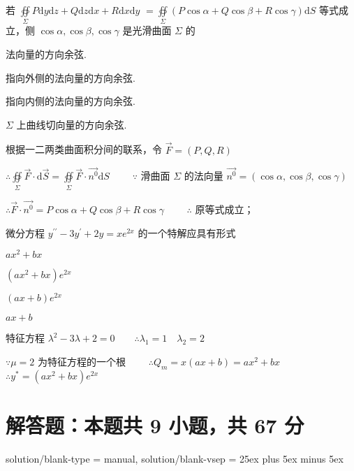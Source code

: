 \begin{question}[points = 3]
    若 $\oiint\limits_\Sigma P\mathrm{d}y\mathrm{d}z + Q\mathrm{d}z\mathrm{d}x + R\mathrm{d}x\mathrm{d}y$
    $= \oiint\limits_\Sigma (P\cos{\alpha} + Q\cos{\beta} + R\cos{\gamma})\mathrm{d}S$ 等式成立，侧 $\cos{\alpha}, \cos{\beta}, \cos{\gamma}$ 是光滑曲面 $\Sigma$ 的 \paren[A]
\end{question}
\begin{choices}
    \item 法向量的方向余弦.
    \item 指向外侧的法向量的方向余弦.
    \item 指向内侧的法向量的方向余弦.
    \item $\Sigma$ 上曲线切向量的方向余弦.
\end{choices}
\begin{solution}
    根据一二两类曲面积分间的联系，令 $\vec{F} = (P, Q, R)$

    $\therefore \oiint\limits_\Sigma \vec{F}\cdot\mathrm{d}\vec{S} = \oiint\limits_\Sigma \vec{F}\cdot\vec{n^0}\mathrm{d}S \qquad$
    $\because$ 滑曲面 $\Sigma$ 的法向量 $\vec{n^0} = (\cos{\alpha}, \cos{\beta}, \cos{\gamma})$

    $\therefore \vec{F}\cdot\vec{n^0} = P\cos{\alpha} + Q\cos{\beta} + R\cos{\gamma} \qquad$
    $\therefore$ 原等式成立；
\end{solution}

\begin{question}[points = 3]
    微分方程 $y^{\prime\prime} - 3y^{\prime} + 2y = xe^{2x}$ 的一个特解应具有形式 \paren[B]
\end{question}
\begin{choices}
    \item $ax^2 + bx$
    \item $(ax^2 + bx)e^{2x}$
    \item $(ax + b)e^{2x}$
    \item $ax + b$
\end{choices}
\begin{solution}
    特征方程 $\lambda^2 - 3\lambda + 2 = 0 \qquad \therefore \lambda_1 = 1 \quad \lambda_2 = 2$

    $\because \mu = 2$ 为特征方程的一个根 $\qquad \therefore Q_m = x(ax + b) = ax^2 + bx \qquad$
    $\therefore y^* = (ax^2 + bx)e^{2x}$
\end{solution}

\section{解答题：本题共 9 小题，共 67 分}
\examsetup
{
    solution/blank-type = manual,
    solution/blank-vsep = 25ex plus 5ex minus 5ex
}

